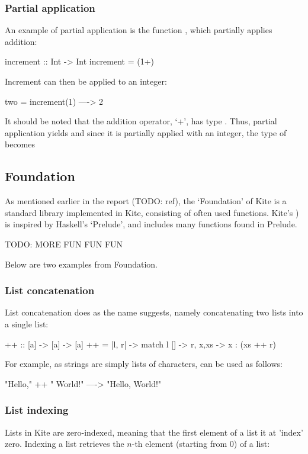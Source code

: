 \subsubsection{Partial application}
An example of partial application is the function , which partially applies addition:

\begin{kite}
increment :: Int -> Int
increment = (1+)
\end{kite}

Increment can then be applied to an integer:

\begin{kite}
two = increment(1) ----> 2
\end{kite}

It should be noted that the addition operator, `+', has type . Thus, partial application yields  and since it is partially applied with an integer, the type of  becomes 


\subsection{Foundation}
As mentioned earlier in the report (TODO: ref), the `Foundation' of Kite is a standard library implemented in Kite, consisting of often used functions. Kite's ) is inspired by Haskell's `Prelude', and includes many functions found in Prelude.

TODO: MORE FUN FUN FUN

Below are two examples from Foundation.

\subsubsection{List concatenation}
List concatenation does as the name suggests, namely concatenating two lists into a single list:

\begin{kite}
{++} :: [a] -> [a] -> [a]
{++} = |l, r| -> {
  match l {
    [] -> r,
    x,xs -> x : (xs ++ r)
  }
}
\end{kite}

For example, as strings are simply lists of characters, \code{++} can be used as follows:

\begin{kite}
"Hello," ++ " World!" ----> "Hello, World!"
\end{kite}

\subsubsection{List indexing}
Lists in Kite are zero-indexed, meaning that the first element of a list it at 'index' zero. Indexing a list retrieves the $n$-th element (starting from 0) of a list:

